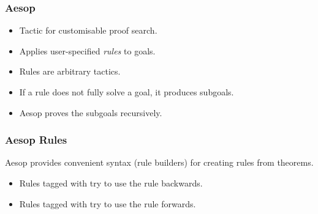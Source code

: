 \begin{frame}
  \frametitle{Aesop}

  \begin{itemize}
    \item Tactic for customisable proof search.
    \item Applies user-specified \emph{rules} to goals.
    \item Rules are arbitrary tactics.
    \item If a rule does not fully solve a goal, it produces subgoals.
    \item Aesop proves the subgoals recursively.
  \end{itemize}
\end{frame}

%


%

\begin{frame}
  \frametitle{Aesop Rules}

  Aesop provides convenient syntax (rule builders) for
  creating rules from theorems.

  \pause

  \begin{itemize}
    \item Rules tagged with  try to use the rule backwards.
    \item Rules tagged with  try to use the rule forwards.
  \end{itemize}
\end{frame}

%

